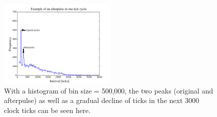 \documentclass[authoryear, 12pt,5p, Times]{elsarticle}
\begin{document}
\begin{figure}[h]
\centering
\includegraphics[width=0.5\textwidth]{figures/afterpulse}
\caption{With a histogram of bin size = 500,000, the two peaks (original and afterpulse) as well as a gradual decline of ticks in the next 3000 clock ticks can be seen here.}
\label{afterpulse}
\end{figure}
\end{document}
